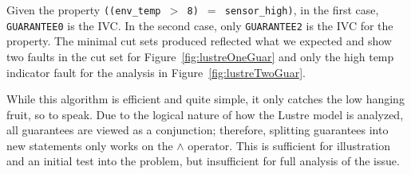 Given the property \texttt{((env\_temp $>$ 8) $=$ sensor\_high)}, in the first case, \texttt{GUARANTEE0} is the IVC. In the second case, only \texttt{GUARANTEE2} is the IVC for the property. The minimal cut sets produced reflected what we expected and show two faults in the cut set for Figure~\ref{fig:lustreOneGuar} and only the high temp indicator fault for the analysis in Figure~\ref{fig:lustreTwoGuar}. 

While this algorithm is efficient and quite simple, it only catches the low hanging fruit, so to speak. Due to the logical nature of how the Lustre model is analyzed, all guarantees are viewed as a conjunction; therefore, splitting guarantees into new statements only works on the $\land$ operator. This is sufficient for illustration and an initial test into the problem, but insufficient for full analysis of the issue. 

